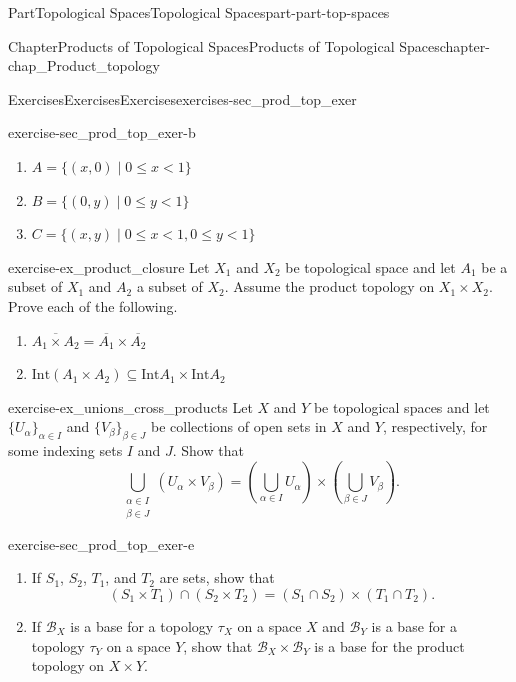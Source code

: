 \documentclass[oneside,10pt,]{book}
\numberwithin{equation}{chapter}
\newcommand{\CB}{\mathcal{B}}
\newcommand{\Int}{\text{Int}}
\newcommand{\lt}{<}
\begin{document}
\begin{partptx}{Part}{Topological Spaces}{}{Topological Spaces}{}{}{part-part-top-spaces}
\begin{chapterptx}{Chapter}{Products of Topological Spaces}{}{Products of Topological Spaces}{}{}{chapter-chap_Product_topology}
\begin{exercises-section}{Exercises}{Exercises}{}{Exercises}{}{}{exercises-sec_prod_top_exer}
\begin{divisionexercise}{2}{}{}{exercise-sec_prod_top_exer-b}
\begin{enumerate}[font=\bfseries,label=(\alph*),ref=\alph*]
\begin{enumerate}[font=\bfseries,label=(\roman*),ref=\theenumi.\roman*]
\item{}\(A = \{(x,0) \mid 0 \leq x \lt 1\}\)%
\item{}\(B = \{(0,y) \mid 0 \leq y \lt 1\}\)%
\item{}\(C = \{(x,y) \mid 0 \leq x \lt 1, 0 \leq y \lt 1\}\)%
\end{enumerate}%
\end{enumerate}%
\end{divisionexercise}%
\begin{divisionexercise}{3}{}{}{exercise-ex_product_closure}%
Let \(X_1\) and \(X_2\) be topological space and let \(A_1\) be a subset of \(X_1\) and \(A_2\) a subset of \(X_2\). Assume the product topology on \(X_1 \times X_2\). Prove each of the following.%
\begin{enumerate}[font=\bfseries,label=(\alph*),ref=\alph*]%
\item{}\(\overline{A_1 \times A_2} = \overline{A_1} \times \overline{A_2}\)%
\item{}\(\Int(A_1 \times A_2) \subseteq \Int{A_1} \times \Int{A_2}\)%
\end{enumerate}%
\end{divisionexercise}%
\begin{divisionexercise}{4}{}{}{exercise-ex_unions_cross_products}%
Let \(X\) and \(Y\) be topological spaces and let \(\{U_{\alpha}\}_{\alpha \in I}\) and \(\{V_{\beta}\}_{\beta \in J}\) be collections of open sets in \(X\) and \(Y\), respectively, for some indexing sets \(I\) and \(J\). Show that%
\begin{equation*}
\bigcup_{\substack{\alpha \in I \\ \beta \in J} } (U_{\alpha} \times V_{\beta}) = \left(\bigcup_{\alpha \in I} U_{\alpha} \right) \times  \left(\bigcup_{\beta \in J} V_{\beta} \right)\text{.}
\end{equation*}
%
\end{divisionexercise}%
\begin{divisionexercise}{5}{}{}{exercise-sec_prod_top_exer-e}%
\begin{enumerate}[font=\bfseries,label=(\alph*),ref=\alph*]%
\item{}If \(S_1\), \(S_2\), \(T_1\), and \(T_2\) are sets, show that%
\begin{equation*}
(S_1 \times T_1) \cap (S_2 \times T_2) = (S_1 \cap S_2) \times (T_1 \cap T_2)\text{.}
\end{equation*}
%
\item{}If \(\CB_X\) is a base for a topology \(\tau_X\) on a space \(X\) and \(\CB_Y\) is a base for a topology \(\tau_Y\) on a space \(Y\), show that \(\CB_X \times \CB_Y\) is a base for the product topology on \(X \times Y\).%

\end{enumerate}
\end{divisionexercise}
\end{exercises-section}
\end{chapterptx}
\end{partptx}
\end{document}
